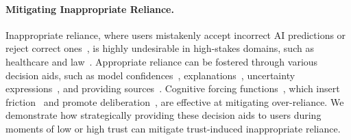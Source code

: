 \paragraph{Mitigating Inappropriate Reliance.} 
Inappropriate reliance, where users mistakenly accept incorrect AI predictions or reject correct ones~\cite{parasuraman1997humans}, is highly undesirable in high-stakes domains, such as healthcare and law~\cite{schemmer2023appropriate}. 
Appropriate reliance can be fostered through various decision aids, such as model confidences~\cite{zhang2020effect,vodrahalli2022uncalibrated}, explanations~\cite{wang2021explanations,bansal2021does}, uncertainty expressions~\cite{zhou-etal-2024-relying,kim2024m}, and providing sources~\cite{feng2019can}. 
Cognitive forcing functions~\cite{buccinca2021trust}, which insert friction~\cite{chen2024exploring,inan2025better} and promote deliberation~\cite{park2019slow,rastogi2022deciding,ma2024towards}, are effective at mitigating over-reliance. 
We demonstrate how strategically providing these decision aids to users during moments of low or high trust can mitigate trust-induced inappropriate reliance.